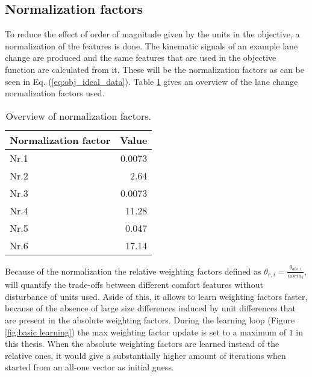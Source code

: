 \subsection{Normalization factors} \label{s:norm}
To reduce the effect of order of magnitude given by the units in the objective, a normalization of the features is done. The kinematic signals of an example lane change are produced and the same features that are used in the objective function are calculated from it. These will be the normalization factors as can be seen in Eq. (\ref{eq:obj_ideal_data}). Table \ref{table:norm} gives an overview of the lane change normalization factors used.  %


\begin{table}[h!]
  \centering
  \begin{tabular}{@{}lr@{}} 
    Normalization factor    & Value\\ \midrule
    Nr.1      & 0.0073\\
    Nr.2          & 2.64\\
    Nr.3 	   & 0.0073\\
    Nr.4       & 11.28\\
    Nr.5       & 0.047\\
    Nr.6  & 17.14\\ \bottomrule
  \end{tabular}
  \caption{Overview of  normalization factors.}
  \label{table:norm}
\end{table}

Because of the normalization the relative weighting factors defined as $\theta_{r,i} = \frac{\theta_{abs,i}}{norm_i}$, will quantify the trade-offs between different comfort features without disturbance of units used. Aside of this, it allows to learn weighting factors faster, because of the absence of large size differences induced by unit differences that are present in the absolute weighting factors. During the learning loop (Figure \ref{fig:basic learning}) the max weighting factor update is set to a maximum of $1$ in this thesis. When the absolute weighting factors are learned instead of the relative ones, it would give a substantially higher amount of iterations when started from an all-one vector as initial guess.

